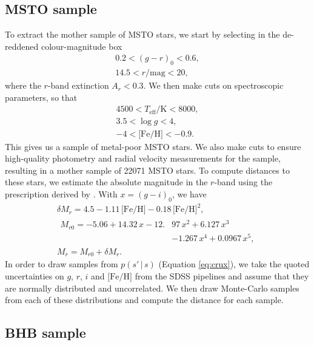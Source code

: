 \documentclass[useAMS,twocolumn,usenatbib]{mn2e}
\begin{document}
\subsection{MSTO sample}

To extract the mother sample of MSTO stars, we start by selecting in the de-reddened colour-magnitude box
%
\begin{gather}
0.2 < (g-r)_0 < 0.6, \nonumber \\
14.5 < r/\mathrm{mag} < 20,
\end{gather}
%
where the $r$-band extinction $A_r<0.3$. We then make cuts on spectroscopic parameters, so that
%
\begin{gather}
4500 < T_{\mathrm{eff}}/\mathrm{K} < 8000, \nonumber \\
3.5 < \log g < 4, \nonumber \\
-4 < \mathrm{\lbrack Fe/H \rbrack} < -0.9.
\end{gather}
% 
This gives us a sample of metal-poor MSTO stars. 
We also make cuts to ensure high-quality photometry and radial velocity measurements for the sample, resulting in a mother sample of 22071 MSTO stars. 
To compute distances to these stars, we estimate the absolute magnitude in the $r$-band using the prescription derived by \cite{Iv08}. 
With $x=(g-i)_0$, we have
%
\begin{gather}
\delta M_r = 4.5 - 1.11\,\lbrack \mathrm{Fe/H} \rbrack -0.18\,\lbrack \mathrm{Fe/H} \rbrack^2, \nonumber \\
\begin{split}
M_{r0} = -5.06 + 14.32\,x - 12.{}&97\,x^2 + 6.127\,x^3 \nonumber \\
                    {}&- 1.267\,x^4 + 0.0967\,x^5,
\end{split}\\
M_r = M_{r0} + \delta M_r.
\end{gather}
% 
In order to draw samples from $p(s' \,|\, s)$ (Equation \ref{eq:crux}), we take the quoted uncertainties on $g$, $r$, $i$ and $\lbrack \mathrm{Fe/H} \rbrack$ from the SDSS pipelines and assume that they are normally distributed and uncorrelated. 
We then draw Monte-Carlo samples from each of these distributions and compute the distance for each sample.

\subsection{BHB sample}
\end{document}
